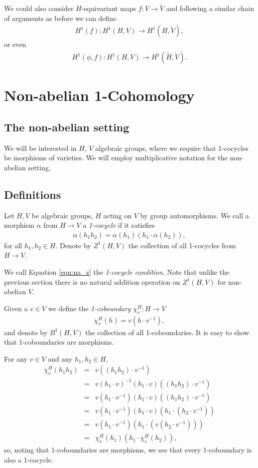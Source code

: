 We could also consider $H$-equivariant maps $f:V\rightarrow\tilde{V}$ and following a similar chain of arguments as before we can define
\begin{eqnarray*}
	H^1(f):H^1(H, V)\rightarrow H^1(H, \tilde{V}),
\end{eqnarray*}
or even	
\begin{eqnarray*}
	H^1(\phi, f):H^1(H, V)\rightarrow H^1(\tilde{H}, \tilde{V}).
\end{eqnarray*}
\section{Non-abelian 1-Cohomology}
	
\subsection{The non-abelian setting}

We will be interested in $H$, $V$ algebraic groups, where we require that 1-cocycles be morphisms of varieties. We will employ multiplicative notation for the non-abelian setting.

\subsection{Definitions}
Let $H, V$ be algebraic groups, $H$ acting on $V$ by group automorphisms. We call a morphism $\alpha$ from $H\rightarrow V$ a \emph{1-cocycle} if it satisfies
\begin{eqnarray}
  \alpha(h_1h_2) = \alpha(h_1) (h_1\cdot\alpha(h_2)),
  \label{eqn:na_z}
\end{eqnarray}
for all $h_1, h_2 \in H$. Denote by $Z^1\left( H, V \right)$ the collection of all 1-cocycles from $H\rightarrow V$.

We call Equation \ref{eqn:na_z} the \emph{1-cocycle condition}. Note that unlike the previous section there is no natural addition operation on $Z^1(H, V)$ for non-abelian $V$.

Given a $v \in V$ we define the \emph{1-coboundary} $\chi^H_v:H\rightarrow V$
\begin{eqnarray*}
	\chi^H_v (h) = v (h\cdot v^{-1}),
\end{eqnarray*}
and denote by $B^1\left(H, V\right)$ the collection of all 1-coboundaries. It is easy to show that 1-coboundaries are morphisms.

For any $v \in V$ and any $h_1, h_2 \in H$,
\begin{eqnarray*}
	\chi^H_v(h_1h_2) &=& v ((h_1h_2) \cdot v^{-1}) \\
	&=& v (h_1 \cdot v)^{-1} (h_1 \cdot v) ((h_1h_2) \cdot v^{-1}) \\
	&=& v (h_1 \cdot v^{-1}) (h_1 \cdot v) ((h_1h_2) \cdot v^{-1}) \\
	&=& v (h_1 \cdot v^{-1}) (h_1 \cdot v) (h_1 \cdot (h_2 \cdot v^{-1})) \\
	&=& v (h_1 \cdot v^{-1}) (h_1 \cdot (v (h_2 \cdot v^{-1}))) \\
	&=& \chi^H_v(h_1) (h_1 \cdot \chi^H_v(h_2)),
\end{eqnarray*}
so, noting that 1-coboundaries are morphisms, we see that every 1-coboundary is also a 1-cocycle. 

